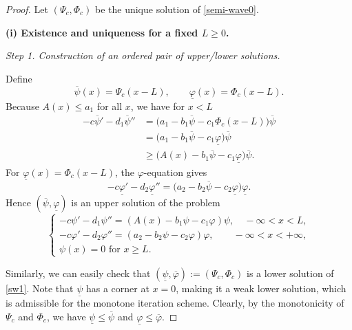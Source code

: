\documentclass[reqno]{amsart}
\newcommand{\rev}[1]{#1}
\theoremstyle{plain}
\theoremstyle{definition}
\theoremstyle{remark}
\begin{document}
	\begin{proof} 
		Let $(\Psi_c,\Phi_c)$ be the unique solution of \eqref{semi-wave0}.
		
		\textbf{(i) Existence and uniqueness for a fixed $L\ge0$.}
		
		\textit{Step 1. Construction of an ordered pair of upper/lower solutions.}
		
		Define
		\[
		\overline\psi(x)=\Psi_c(x-L),\qquad \underline\varphi(x)=\Phi_c(x-L).
		\]
		Because $A(x)\le a_1$ for all $x$, we have for $x<L$
		\[
		\begin{aligned}
			-c\overline\psi'-d_1\overline\psi'' 
			&= \bigl(a_1-b_1\overline\psi-c_1\Phi_c(x-L)\bigr)\overline\psi \\
			&= \bigl(a_1-b_1\overline\psi-c_1\underline\varphi\bigr)\overline\psi \\
			&\ge \bigl(A(x)-b_1\overline\psi-c_1\underline\varphi\bigr)\overline\psi .
		\end{aligned}
		\]
		For $\underline\varphi(x)=\Phi_c(x-L)$, the $\varphi$-equation gives
		\[
		-c\underline\varphi'-d_2\underline\varphi'' = \bigl(a_2-b_2\overline\psi-c_2\underline\varphi\bigr)\underline\varphi.
		\]
		Hence $(\overline\psi,\underline\varphi)$ is an upper solution of the problem
		\begin{equation}\label{sw1}
			\begin{cases}
				-c \psi' - d_1 \psi'' = (A(x) - b_1\psi - c_1\varphi)\psi, \quad-\infty < x < L,\\
				-c \varphi' - d_2 \varphi'' = (a_2 - b_2\psi - c_2\varphi)\varphi, \qquad -\infty < x < +\infty,\\
				\psi(x)=0 \text{ for } x\ge L.
			\end{cases}
		\end{equation}
		
		Similarly, we can easily check that $(\underline\psi,\overline\varphi) := (\Psi_c, \Phi_c)$ is a lower solution of \eqref{sw1}. Note that $\underline\psi$ has a corner at \rev{$x=0$}, making it a weak lower solution, which is admissible for the monotone iteration scheme. Clearly, by the monotonicity of $\Psi_c$ and $\Phi_c$, we have $\underline\psi\le\overline\psi$
		and $\underline\varphi\le\overline\varphi$.
		

\end{proof}
\end{document}
